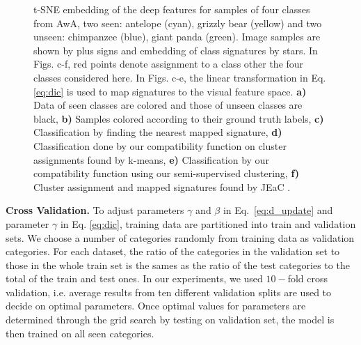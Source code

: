 \documentclass[10pt,twocolumn,letterpaper]{article}
\begin{document}
\begin{figure}[t]
\begin{subfigure}[b]{0.25\linewidth}
  \end{subfigure}
  \caption{t-SNE embedding of the deep features for samples of four classes from AwA, two seen: antelope (cyan), grizzly bear (yellow) and two
  unseen: chimpanzee (blue), giant panda (green). Image samples are shown by plus signs and embedding of class signatures by stars.
  In Figs. c-f, red points denote assignment to a class other the four classes considered here. In Figs. c-e, the linear transformation in Eq. \eqref{eq:dic} is used to map signatures to the visual feature space.
  \textbf{a)} Data of seen classes are colored and those of unseen classes are black,
  \textbf{b)} Samples colored according to their ground truth labels,
  \textbf{c)} Classification by finding the nearest mapped signature,
  \textbf{d)} Classification done by our compatibility function on cluster assignments found by k-means,
  \textbf{e)} Classification by our compatibility function using our semi-supervised clustering,
  \textbf{f)} Cluster assignment and mapped signatures found by JEaC .
  }
  \label{fig:tsne}
\end{figure}


\textbf{Cross Validation.}
To adjust parameters $\gamma$ and $\beta$ in Eq.~\eqref{eq:d_update} and parameter $\gamma$ in Eq. \eqref{eq:dic},
 training data are partitioned into train and validation sets.
We choose a number of categories randomly from training data as validation categories. For each dataset, the ratio of the categories in the
validation set to those in the whole train set is the sames as the ratio of the test categories to the total of the train and test ones.
In our experiments, we used $10-$fold cross validation, i.e. average results from ten different validation splits are used to decide on
optimal parameters.
Once optimal values for parameters are determined through the grid search by testing on validation set, the model
is then trained on all seen categories.
\end{document}
